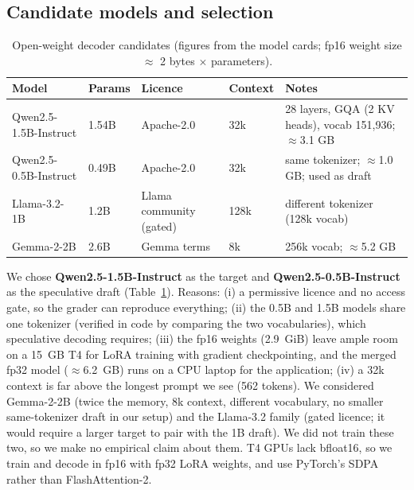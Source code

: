 \documentclass[conference]{IEEEtran}
\begin{document}
\subsection{Candidate models and selection}\label{sec:model}
\begin{table}[t]
\centering\footnotesize
\caption{Open-weight decoder candidates (figures from the model cards; fp16 weight size $\approx$ 2 bytes $\times$ parameters).}
\label{tab:models}
\begin{tabular}{@{}p{1.75cm}p{0.9cm}p{1.2cm}p{0.9cm}p{2.0cm}@{}}\toprule
Model & Params & Licence & Context & Notes\\\midrule
Qwen2.5-1.5B-Instruct & 1.54B & Apache-2.0 & 32k & 28 layers, GQA (2 KV heads), vocab 151,936; $\approx$3.1 GB\\
Qwen2.5-0.5B-Instruct & 0.49B & Apache-2.0 & 32k & same tokenizer; $\approx$1.0 GB; used as draft\\
Llama-3.2-1B & 1.2B & Llama community (gated) & 128k & different tokenizer (128k vocab)\\
Gemma-2-2B & 2.6B & Gemma terms & 8k & 256k vocab; $\approx$5.2 GB\\\bottomrule
\end{tabular}
\end{table}
We chose \textbf{Qwen2.5-1.5B-Instruct} as the target and \textbf{Qwen2.5-0.5B-Instruct} as the speculative draft (Table~\ref{tab:models}). Reasons: (i) a permissive licence and no access gate, so the grader can reproduce everything; (ii) the 0.5B and 1.5B models share one tokenizer (verified in code by comparing the two vocabularies), which speculative decoding requires; (iii) the fp16 weights (2.9~GiB) leave ample room on a 15~GB T4 for LoRA training with gradient checkpointing, and the merged fp32 model ($\approx$6.2~GB) runs on a CPU laptop for the application; (iv) a 32k context is far above the longest prompt we see (562 tokens). We considered Gemma-2-2B (twice the memory, 8k context, different vocabulary, no smaller same-tokenizer draft in our setup) and the Llama-3.2 family (gated licence; it would require a larger target to pair with the 1B draft). We did not train these two, so we make no empirical claim about them. T4 GPUs lack bfloat16, so we train and decode in fp16 with fp32 LoRA weights, and use PyTorch's SDPA rather than FlashAttention-2.
\end{document}

